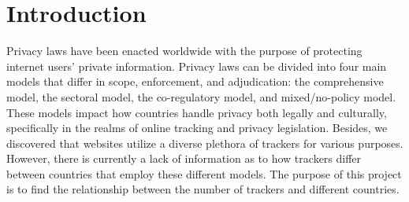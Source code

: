 \documentclass[12pt,draft,onecolumn]{IEEEtran}
\begin{document}




\maketitle








%
\IEEEpeerreviewmaketitle



\section{Introduction}
% 
% 
% 
% 
Privacy laws have been enacted worldwide with the purpose of protecting internet users' private information. Privacy laws can be divided into four main models \cite{IAPPbook} that differ in scope, enforcement, and adjudication: the comprehensive model, the sectoral model, the co-regulatory model, and mixed/no-policy model. These models impact how countries handle privacy both legally and culturally, specifically in the realms of online tracking and privacy legislation. Besides, we discovered that websites utilize a diverse plethora of trackers for various purposes. However, there is currently a lack of information as to how trackers differ between countries that employ these different models. The purpose of this project is to find the relationship between the number of trackers and different countries. 
\end{document}
